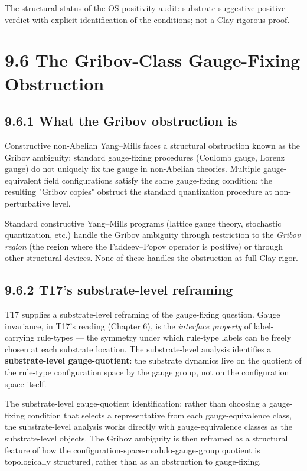 \documentclass[11pt]{book}
\begin{document}
The structural status of the OS-positivity audit: substrate-suggestive positive verdict with explicit identification of the conditions; not a Clay-rigorous proof.

\section{9.6 The Gribov-Class Gauge-Fixing Obstruction}

\subsection{9.6.1 What the Gribov obstruction is}

Constructive non-Abelian Yang–Mills faces a structural obstruction known as the Gribov ambiguity: standard gauge-fixing procedures (Coulomb gauge, Lorenz gauge) do not uniquely fix the gauge in non-Abelian theories. Multiple gauge-equivalent field configurations satisfy the same gauge-fixing condition; the resulting "Gribov copies" obstruct the standard quantization procedure at non-perturbative level.

Standard constructive Yang–Mills programs (lattice gauge theory, stochastic quantization, etc.) handle the Gribov ambiguity through restriction to the \textit{Gribov region} (the region where the Faddeev–Popov operator is positive) or through other structural devices. None of these handles the obstruction at full Clay-rigor.

\subsection{9.6.2 T17's substrate-level reframing}

T17 supplies a substrate-level reframing of the gauge-fixing question. Gauge invariance, in T17's reading (Chapter 6), is the \textit{interface property} of label-carrying rule-types — the symmetry under which rule-type labels can be freely chosen at each substrate location. The substrate-level analysis identifies a \textbf{substrate-level gauge-quotient}: the substrate dynamics live on the quotient of the rule-type configuration space by the gauge group, not on the configuration space itself.

The substrate-level gauge-quotient identification: rather than choosing a gauge-fixing condition that selects a representative from each gauge-equivalence class, the substrate-level analysis works directly with gauge-equivalence classes as the substrate-level objects. The Gribov ambiguity is then reframed as a structural feature of how the configuration-space-modulo-gauge-group quotient is topologically structured, rather than as an obstruction to gauge-fixing.
\end{document}
